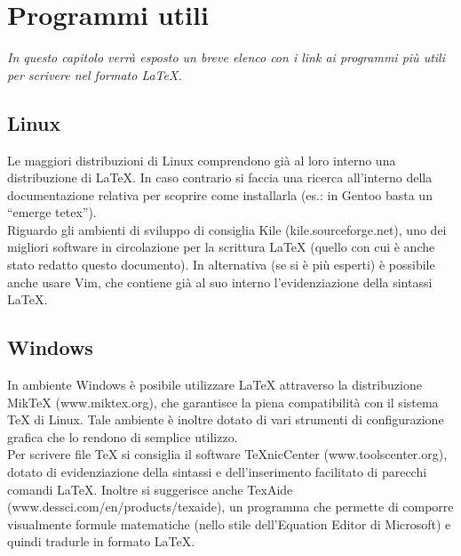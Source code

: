 \chapter{Programmi utili}

\begin{minipage}{12cm}\textit{In questo capitolo verr\`a esposto un breve elenco con i link ai programmi pi\`u utili per scrivere nel formato LaTeX.}
\end{minipage}

\vspace*{1cm}

\section{Linux}

Le maggiori distribuzioni di Linux comprendono gi\`a al loro interno una distribuzione di LaTeX. In caso contrario si faccia una ricerca all'interno della documentazione relativa per scoprire come installarla (es.: in Gentoo basta un ``emerge tetex'').\\

Riguardo gli ambienti di sviluppo di consiglia Kile (kile.sourceforge.net), uno dei migliori software in circolazione per la scrittura LaTeX (quello con cui \`e anche stato redatto questo documento). In alternativa (se si \`e pi\`u esperti) \`e possibile anche usare Vim, che contiene gi\`a al suo interno l'evidenziazione della sintassi LaTeX.


\section{Windows}

In ambiente Windows \`e posibile utilizzare LaTeX attraverso la distribuzione MikTeX (www.miktex.org), che garantisce la piena compatibilit\`a con il sistema TeX di Linux. Tale ambiente \`e inoltre dotato di vari strumenti di configurazione grafica che lo rendono di semplice utilizzo.\\

Per scrivere file TeX si consiglia il software TeXnicCenter (www.toolscenter.org), dotato di evidenziazione della sintassi e dell'inserimento facilitato di parecchi comandi LaTeX. Inoltre si suggerisce anche TexAide (www.dessci.com/en/products/texaide), un programma che permette di comporre visualmente formule matematiche (nello stile dell'Equation Editor di Microsoft) e quindi tradurle in formato LaTeX.